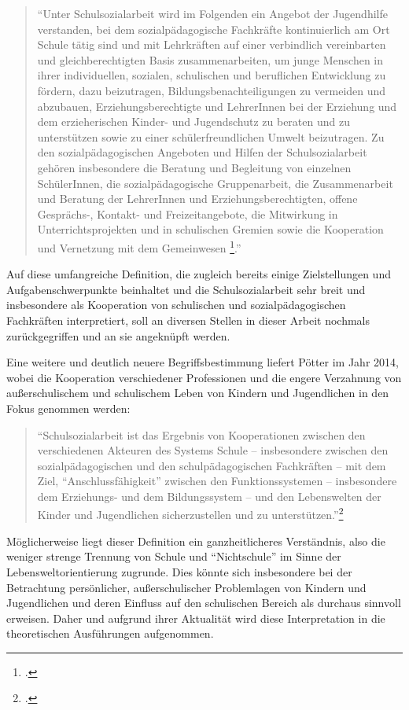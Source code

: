 \begin{quotation}
\noindent
"`Unter Schulsozialarbeit wird im Folgenden ein Angebot der Jugendhilfe verstanden, bei dem sozialpädagogische Fachkräfte kontinuierlich am Ort Schule tätig sind und mit Lehrkräften auf einer verbindlich vereinbarten und gleichberechtigten Basis zusammenarbeiten, um junge Menschen in ihrer individuellen, sozialen, schulischen und beruflichen Entwicklung zu fördern, dazu beizutragen, Bildungsbenachteiligungen zu vermeiden und abzubauen, Erziehungsberechtigte und LehrerInnen bei der Erziehung und dem erzieherischen Kinder- und Jugendschutz zu beraten und zu unterstützen sowie zu einer schülerfreundlichen Umwelt beizutragen. Zu den sozialpädagogischen Angeboten und Hilfen der Schulsozialarbeit gehören insbesondere die Beratung und Begleitung von einzelnen SchülerInnen, die sozialpädagogische Gruppenarbeit, die Zusammenarbeit und Beratung der LehrerInnen und Erziehungsberechtigten, offene Gesprächs-, Kontakt- und Freizeitangebote, die Mitwirkung in Unterrichtsprojekten und in schulischen Gremien sowie die Kooperation und Vernetzung mit dem Gemeinwesen \footcite[28]{Speck2007}."'
\end{quotation}

\noindent
Auf diese umfangreiche Definition, die zugleich bereits einige Zielstellungen und Aufgabenschwerpunkte beinhaltet und die Schulsozialarbeit sehr breit und insbesondere als Kooperation von schulischen und sozialpädagogischen Fachkräften interpretiert, soll an diversen Stellen in dieser Arbeit nochmals zurückgegriffen und an sie angeknüpft werden. 

Eine weitere und deutlich neuere Begriffsbestimmung liefert Pötter im Jahr 2014, wobei die Kooperation verschiedener Professionen und die engere Verzahnung von außerschulischem und schulischem Leben von Kindern und Jugendlichen in den Fokus genommen werden:

\begin{quotation}
\noindent
"`Schulsozialarbeit ist das Ergebnis von Kooperationen zwischen den verschiedenen Akteuren des Systems Schule -- insbesondere zwischen den sozialpädagogischen und den schulpädagogischen Fachkräften -- mit dem Ziel, "`Anschlussfähigkeit"' zwischen den Funktionssystemen -- insbesondere dem Erziehungs- und dem Bildungssystem -- und den Lebenswelten der Kinder und Jugendlichen sicherzustellen und zu unterstützen."'\footcite[23]{Poetter2014}
\end{quotation}

\noindent
Möglicherweise liegt dieser Definition ein ganzheitlicheres Verständnis, also die weniger strenge Trennung von Schule und "`Nichtschule"' im Sinne der Lebensweltorientierung zugrunde. Dies könnte sich insbesondere bei der Betrachtung persönlicher, außerschulischer Problemlagen von Kindern und Jugendlichen und deren Einfluss auf den schulischen Bereich als durchaus sinnvoll erweisen. Daher und aufgrund ihrer Aktualität wird diese Interpretation in die theoretischen Ausführungen aufgenommen.
 
